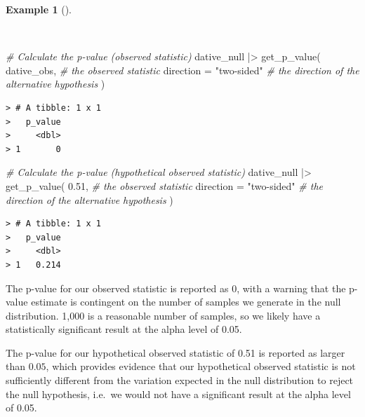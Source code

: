 \documentclass[
  letterpaper,
  DIV=11,
  numbers=noendperiod]{scrreprt}
\newenvironment{Shaded}{\begin{snugshade}}{\end{snugshade}}
\newcommand{\AttributeTok}[1]{\textcolor[rgb]{0.00,0.00,0.00}{#1}}
\newcommand{\CommentTok}[1]{\textcolor[rgb]{0.00,0.00,0.00}{\textit{#1}}}
\newcommand{\FloatTok}[1]{\textcolor[rgb]{0.00,0.00,0.00}{#1}}
\newcommand{\FunctionTok}[1]{\textcolor[rgb]{0.00,0.00,0.00}{#1}}
\newcommand{\NormalTok}[1]{\textcolor[rgb]{0.00,0.00,0.00}{#1}}
\newcommand{\SpecialCharTok}[1]{\textcolor[rgb]{0.00,0.00,0.00}{#1}}
\newcommand{\StringTok}[1]{\textcolor[rgb]{0.00,0.00,0.00}{#1}}
\theoremstyle{definition}
\newtheorem{example}{Example}[chapter]
\theoremstyle{remark}
\begin{document}
\begin{example}[]\protect\hypertarget{exm-ida-cat-p-value}{}\label{exm-ida-cat-p-value}

~

\begin{Shaded}
\begin{Highlighting}[]
\CommentTok{\# Calculate the p{-}value (observed statistic)}
\NormalTok{dative\_null }\SpecialCharTok{|\textgreater{}}
  \FunctionTok{get\_p\_value}\NormalTok{(}
\NormalTok{    dative\_obs, }\CommentTok{\# the observed statistic}
    \AttributeTok{direction =} \StringTok{"two{-}sided"} \CommentTok{\# the direction of the alternative hypothesis}
\NormalTok{  )}
\end{Highlighting}
\end{Shaded}

\begin{verbatim}
> # A tibble: 1 x 1
>   p_value
>     <dbl>
> 1       0
\end{verbatim}

\begin{Shaded}
\begin{Highlighting}[]
\CommentTok{\# Calculate the p{-}value (hypothetical observed statistic)}
\NormalTok{dative\_null }\SpecialCharTok{|\textgreater{}}
  \FunctionTok{get\_p\_value}\NormalTok{(}
    \FloatTok{0.51}\NormalTok{, }\CommentTok{\# the observed statistic}
    \AttributeTok{direction =} \StringTok{"two{-}sided"} \CommentTok{\# the direction of the alternative hypothesis}
\NormalTok{  )}
\end{Highlighting}
\end{Shaded}

\begin{verbatim}
> # A tibble: 1 x 1
>   p_value
>     <dbl>
> 1   0.214
\end{verbatim}

\end{example}

The p-value for our observed statistic is reported as \(0\), with a
warning that the p-value estimate is contingent on the number of samples
we generate in the null distribution. 1,000 is a reasonable number of
samples, so we likely have a statistically significant result at the
alpha level of 0.05.

The p-value for our hypothetical observed statistic of 0.51 is reported
as larger than \(0.05\), which provides evidence that our hypothetical
observed statistic is not sufficiently different from the variation
expected in the null distribution to reject the null hypothesis, i.e.~we
would not have a significant result at the alpha level of 0.05.
\end{document}
